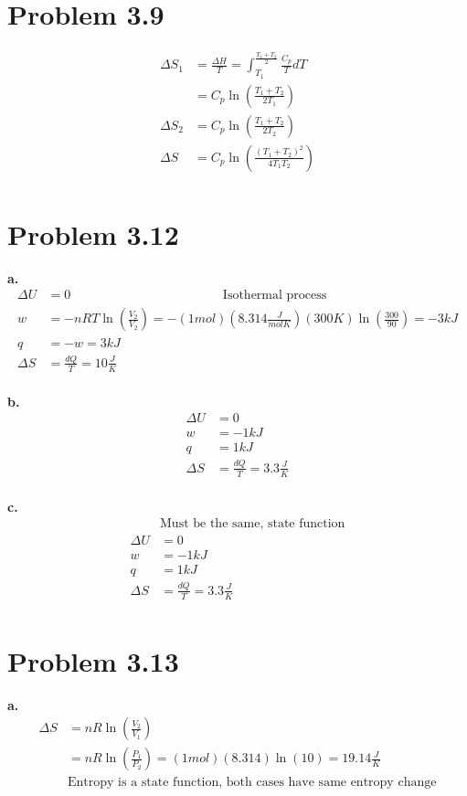 \documentclass[10pt]{article} %
\begin{document}
\section{Problem 3.9}
\begin{align*}
  \Delta S_1 &= \frac{\Delta H}{T} = \int_{T_1}^{\frac{T_1+T_2}{2}} \frac{C_p}{T}dT\\
    &= C_p\ln\left(\frac{T_1+T_2}{2T_1}\right)\\
    \Delta S_2 &= C_p\ln\left(\frac{T_1+T_2}{2T_2}\right)\\
    \Delta S &= C_p\ln\left(\frac{\left(T_1+T_2\right)^2}{4T_1T_2}\right)\\
\end{align*}

\section{Problem 3.12}
\textbf{a.}
\begin{align*}
  \Delta U &= 0
  \hspace{5cm} \mbox{Isothermal process}\\
  w &= -nRT\ln\left(\frac{V_2}{V_2}\right) = -(1 mol)(8.314 \frac{J}{mol K})(300K)\ln\left(\frac{300}{90}\right) = -3kJ\\
  q &= -w = 3kJ\\
  \Delta S &= \frac{dQ}{T} = 10 \frac{J}{K}\\
\end{align*}

\textbf{b.}
\begin{align*}
  \Delta U &= 0\\
  w &=  -1kJ\\
  q &=   1kJ\\
  \Delta S &= \frac{dQ}{T} = 3.3 \frac{J}{K}\\
\end{align*}

\textbf{c.}
\begin{align*}
  &\mbox{Must be the same, state function}\\
  \Delta U &= 0\\
  w &=  -1kJ\\
  q &= 1kJ\\
  \Delta S &= \frac{dQ}{T} = 3.3 \frac{J}{K}\\
\end{align*}

\section{Problem 3.13}
\textbf{a.}
\begin{align*}
  \Delta S &= nR\ln\left(\frac{V_2}{V_1}\right)\\
  &= nR\ln\left(\frac{P_1}{P_2}\right) = (1 mol)(8.314)\ln(10) = 19.14 \frac{J}{K}\\
  &\mbox{Entropy is a state function, both cases have same entropy change}\\
\end{align*}
\end{document}
